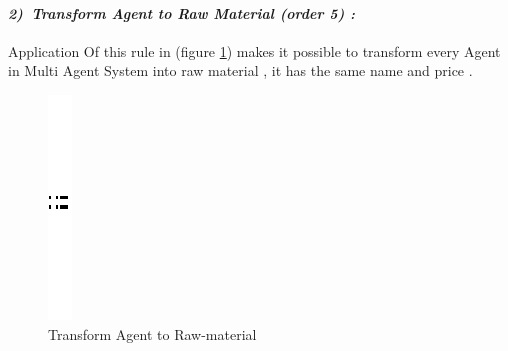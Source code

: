 \paragraph{\emph{2)~Transform Agent to Raw Material (order 5) :} }
Application Of this rule in (figure \ref{fig:Generate for each agent raw material}) makes it possible to transform  every Agent in Multi Agent System into raw material , it has the same name and price  .
\vspace{1cm}
\begin{figure}[th]
\centering
	\quad{}
		\includegraphics{Chapiter3/img/sep}
	\quad{}
\caption{\label{fig:Generate for each agent raw material}Transform Agent to Raw-material} 
\end{figure}
\vspace{1cm}

